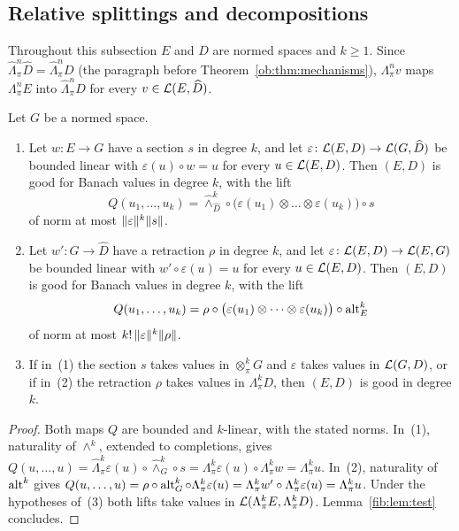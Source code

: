 \subsection{Relative splittings and decompositions}\label{cmb:ssec:decompositions}

Throughout this subsection $E$ and $D$ are normed spaces and $k\ge1$. Since
$\widehat\Lambda^n_\pi\widehat D=\widehat\Lambda^n_\pi D$ (the paragraph before Theorem~\ref{ob:thm:mechanisms}),
$\Lambda^n_\pi v$ maps $\Lambda^n_\pi E$ into $\widehat\Lambda^n_\pi D$ for every $v\in\mathcal L(E,\widehat D)$.

\begin{proposition}\label{cmb:prop:relative}
Let $G$ be a normed space.
\begin{enumerate}
\item Let $w\colon E\to G$ have a section $s$ in degree $k$, and let $\varepsilon\colon\mathcal L(E,D)\to\mathcal L(G,\widehat D)$ be
bounded linear with $\varepsilon(u)\circ w=u$ for every $u\in\mathcal L(E,D)$. Then $(E,D)$ is good for Banach values in degree
$k$, with the lift
\[
 Q(u_1,\dots,u_k)=\widehat\wedge^k_{\widehat D}\circ\bigl(\varepsilon(u_1)\otimes\dots\otimes\varepsilon(u_k)\bigr)\circ s
\]
of norm at most $\lVert \varepsilon\rVert^k\lVert s\rVert$.
\item Let $w'\colon G\to\widehat D$ have a retraction $\rho$ in degree $k$, and let
$\varepsilon\colon\mathcal L(E,D)\to\mathcal L(E,G)$ be bounded linear with $w'\circ\varepsilon(u)=u$ for every $u\in\mathcal L(E,D)$. Then
$(E,D)$ is good for Banach values in degree $k$, with the lift
\[
 Q(u_1,\dots,u_k)=\rho\circ\bigl(\varepsilon(u_1)\otimes\dots\otimes\varepsilon(u_k)\bigr)\circ\operatorname{alt}^k_E
\]
of norm at most $k!\,\lVert \varepsilon\rVert^k\lVert \rho\rVert$.
\item If in~(1) the section $s$ takes values in $\otimes^k_\pi G$ and $\varepsilon$ takes values in $\mathcal L(G,D)$, or if
in~(2) the retraction $\rho$ takes values in $\Lambda^k_\pi D$, then $(E,D)$ is good in degree $k$.
\end{enumerate}
\end{proposition}

\begin{proof}
Both maps $Q$ are bounded and $k$-linear, with the stated norms. In~(1), naturality of $\wedge^k$, extended to
completions, gives $Q(u,\dots,u)=\widehat\Lambda^k_\pi\varepsilon(u)\circ\widehat\wedge^k_G\circ s
=\Lambda^k_\pi\varepsilon(u)\circ\Lambda^k_\pi w=\Lambda^k_\pi u$. In~(2), naturality of $\operatorname{alt}^k$ gives
$Q(u,\dots,u)=\rho\circ\operatorname{alt}^k_G\circ\Lambda^k_\pi\varepsilon(u)=\Lambda^k_\pi w'\circ\Lambda^k_\pi\varepsilon(u)
=\Lambda^k_\pi u$. Under the hypotheses of~(3) both lifts take values in $\mathcal L(\Lambda^k_\pi E,\Lambda^k_\pi D)$.
Lemma~\ref{fib:lem:test} concludes.
\end{proof}

